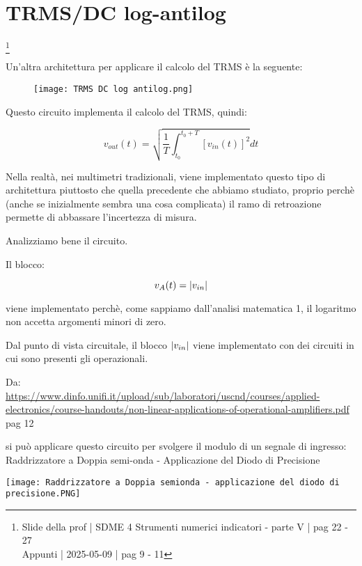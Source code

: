 \newpage 

\section{TRMS/DC log-antilog}
\footnote{Slide della prof | SDME 4 Strumenti numerici indicatori - parte V | pag 22 - 27\\  
Appunti | 2025-05-09 | pag 9 - 11}

Un'altra architettura per applicare il calcolo del TRMS è la seguente: 

\begin{figure}[h]
    \centering
    \texttt{[image: TRMS DC log antilog.png]}
\end{figure}

Questo circuito implementa il calcolo del TRMS, quindi: 

{
    \Large 
    \begin{equation}
        v_{out} (t)
        =
        \sqrt{\frac{1}{T} \int_{t_0}^{t_0 + T} [v_{in} (t)]^{2}} dt
    \end{equation}
}

Nella realtà, nei multimetri tradizionali, viene implementato questo tipo di architettura piuttosto che quella precedente che abbiamo studiato, proprio perchè (anche se inizialmente sembra una cosa complicata) 
il ramo di retroazione permette di abbassare l'incertezza di misura. \newline 


Analizziamo bene il circuito. \newline 

Il blocco: 

{
    \Large 
    \begin{equation}
        v_A (t) 
        = 
        \abs{v_{in}} 
    \end{equation}
}

viene implementato perchè, come sappiamo dall'analisi matematica 1, il logaritmo non accetta argomenti minori di zero. \newline 

Dal punto di vista circuitale, il blocco $\abs{v_{in}}$ viene implementato con dei circuiti in cui sono presenti gli operazionali. \newline 

\begin{tcolorbox}
    Da: \\
    \url{https://www.dinfo.unifi.it/upload/sub/laboratori/uscnd/courses/applied-electronics/course-handouts/non-linear-applications-of-operational-amplifiers.pdf}
    pag 12 \newline 

    si può applicare questo circuito per svolgere il modulo di un segnale di ingresso: \\ 
    Raddrizzatore a Doppia semi-onda - Applicazione del Diodo di Precisione

    \texttt{[image: Raddrizzatore a Doppia semionda - applicazione del diodo di precisione.PNG]}
    
\end{tcolorbox}

